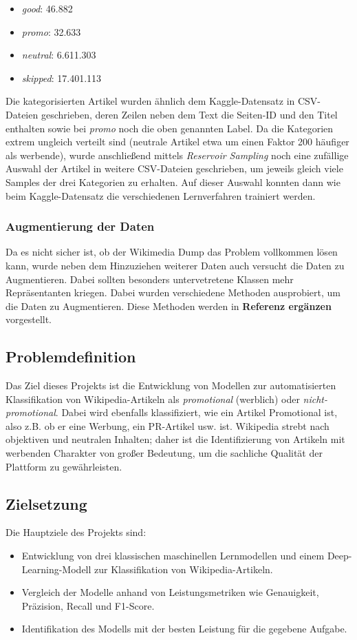 \begin{itemize}
    \item \emph{good}: 46.882
    \item \emph{promo}: 32.633
    \item \emph{neutral}: 6.611.303
    \item \emph{skipped}: 17.401.113
\end{itemize}
Die kategorisierten Artikel wurden ähnlich dem Kaggle-Datensatz in CSV-Dateien geschrieben, deren Zeilen neben dem Text die Seiten-ID und den Titel enthalten sowie bei \emph{promo} noch die oben genannten Label. Da die Kategorien extrem ungleich verteilt sind (neutrale Artikel etwa um einen Faktor 200 häufiger als werbende), wurde anschließend mittels \textit{Reservoir Sampling} noch eine zufällige Auswahl der Artikel in weitere CSV-Dateien geschrieben, um jeweils gleich viele Samples der drei Kategorien zu erhalten. Auf dieser Auswahl konnten dann wie beim Kaggle-Datensatz die verschiedenen Lernverfahren trainiert werden.

\subsubsection{Augmentierung der Daten}
Da es nicht sicher ist, ob der Wikimedia Dump das Problem vollkommen lösen kann, wurde neben dem Hinzuziehen weiterer Daten auch versucht die Daten zu Augmentieren. Dabei sollten besonders untervetretene Klassen mehr Repräsentanten kriegen. Dabei wurden verschiedene Methoden ausprobiert, um die Daten zu Augmentieren. Diese Methoden werden in \textbf{Referenz ergänzen} vorgestellt.

\subsection{Problemdefinition}
Das Ziel dieses Projekts ist die Entwicklung von Modellen zur automatisierten Klassifikation von Wikipedia-Artikeln als \emph{promotional} (werblich) oder \emph{nicht-promotional}. Dabei wird ebenfalls klassifiziert, wie ein Artikel Promotional ist, also z.B. ob er eine Werbung, ein PR-Artikel usw. ist. Wikipedia strebt nach objektiven und neutralen Inhalten; daher ist die Identifizierung von Artikeln mit werbenden Charakter von großer Bedeutung, um die sachliche Qualität der Plattform zu gewährleisten.

\subsection{Zielsetzung}

Die Hauptziele des Projekts sind:

\begin{itemize} \item Entwicklung von drei klassischen maschinellen Lernmodellen und einem Deep-Learning-Modell zur Klassifikation von Wikipedia-Artikeln. \item Vergleich der Modelle anhand von Leistungsmetriken wie Genauigkeit, Präzision, Recall und F1-Score. \item Identifikation des Modells mit der besten Leistung für die gegebene Aufgabe. \end{itemize}